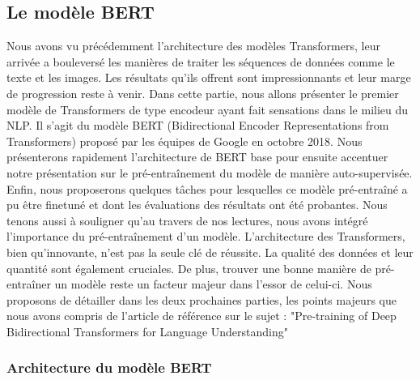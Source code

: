 \documentclass[12pt]{article}
\theoremstyle{definition}
\begin{document}
 
\subsection{Le modèle BERT}

Nous avons vu précédemment l’architecture des modèles Transformers, leur arrivée a bouleversé les manières de traiter les séquences de données comme le texte et les images. Les résultats qu'ils offrent sont impressionnants et leur marge de progression reste à venir. Dans cette partie, nous allons présenter le premier modèle de Transformers de type encodeur ayant fait sensations dans le milieu du NLP. Il s’agit du modèle BERT (Bidirectional Encoder Representations from Transformers) proposé par les équipes de Google en octobre 2018. Nous présenterons rapidement l’architecture de BERT base pour ensuite accentuer notre présentation sur le pré-entraînement du modèle de manière auto-supervisée. Enfin, nous proposerons quelques tâches pour lesquelles ce modèle pré-entraîné a pu être finetuné et dont les évaluations des résultats ont été probantes. Nous tenons aussi à souligner qu’au travers de nos lectures, nous avons intégré l’importance du pré-entraînement d’un modèle. L’architecture des Transformers, bien qu’innovante, n’est pas la seule clé de réussite. La qualité des données et leur quantité sont également cruciales. De plus, trouver une bonne manière de pré-entraîner un modèle reste un facteur majeur dans l’essor de celui-ci. Nous proposons de détailler dans les deux prochaines parties, les points majeurs que nous avons compris de l'article de référence sur le sujet : "Pre-training of Deep Bidirectional Transformers for
Language Understanding" \cite{bert_paper}

\subsubsection{Architecture du modèle BERT}
\end{document}
